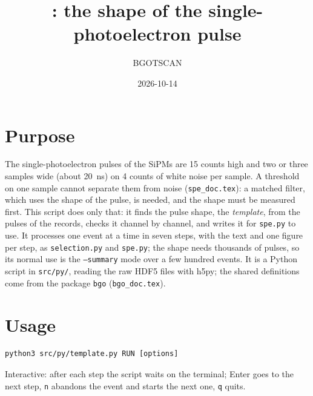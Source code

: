 \documentclass[11pt]{article}
\title{\code{template.py}: the shape of the single-photoelectron pulse}
\author{BGOTSCAN}
\date{2026-10-14}
\newcommand{\code}[1]{\texttt{#1}}
\begin{document}
\maketitle

\section{Purpose}

The single-photoelectron pulses of the SiPMs are 15 counts high and two or
three samples wide (about 20~ns) on 4 counts of white noise per sample. A
threshold on one sample cannot separate them from noise
(\code{spe\_doc.tex}): a matched filter, which uses the shape of the pulse,
is needed, and the shape must be measured first. This script does only
that: it finds the pulse shape, the \emph{template}, from the pulses of
the records, checks it channel by channel, and writes it for
\code{spe.py} to use. It processes one event at a time in seven steps, with
the text and one figure per step, as \code{selection.py} and
\code{spe.py}; the shape needs thousands of pulses, so its normal use is
the \code{--summary} mode over a few hundred events. It is a Python script
in \code{src/py/}, reading the raw HDF5 files with h5py; the shared definitions come from the
package \code{bgo} (\code{bgo\_doc.tex}).

\section{Usage}

\begin{lstlisting}
python3 src/py/template.py RUN [options]
\end{lstlisting}

Interactive: after each step the script waits on the terminal; Enter goes
to the next step, \code{n} abandons the event and starts the next one,
\code{q} quits.
\end{document}
